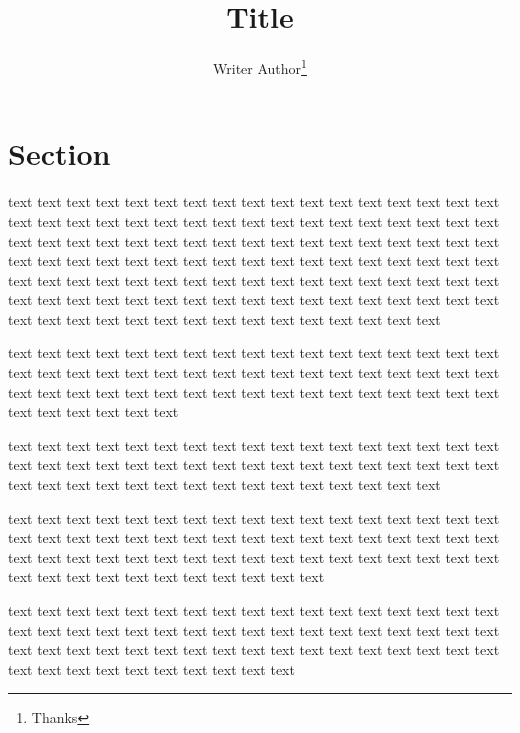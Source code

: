 \documentclass{article}
\title{Title}
\author{Writer Author\thanks{Thanks}}
\begin{document}
\sloppy%

\maketitle

%
\section{Section}
text text text text text text text text text text text text text text text text text text text text text text text text text text text text text text text text text text text text text text text text text text text text text text text text text text text text text text text text text text text text text text text
    text text text text text text text text text text text text text text text text text text text text text text text text text text text text text text text text text text text text text text text text text text text text text text text text text text text text text text

    text text text text text text text text text text text text text text text text text text text text text text text text text text text text text text text text text text text text text text text text text text text text text text text text text text text text text text text text text

    text text \cite{citation1} text text text text text text text text text text text text text text text text text text text text text text text text text text text text text text text text text text text text text text text text text text text text text text text

    text text text text text text text text text text text text text text text text text text text text text text text text text text text text text text text text text text text text text text text text text text text text text text text text text text text text text text text text text text text text text text

    text text text text text text text text text text text text text text text text text text text text text text text text text text text text text text text text text text text text text text text text text text text text text text text text text text text text text text text text text text text text text
\end{document}
